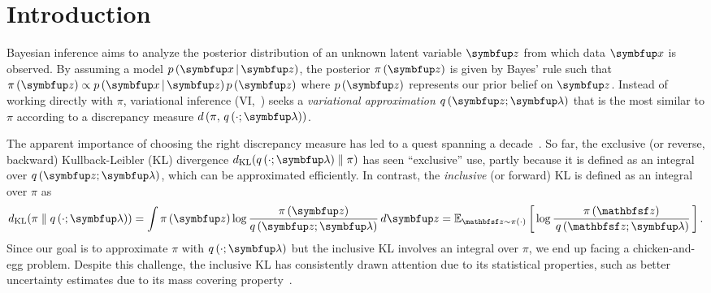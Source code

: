 
\section{Introduction}\label{section:intro}
Bayesian inference aims to analyze the posterior distribution of an unknown latent variable \(\vz\) from which data \(\vx\) is observed.
By assuming a model \(p\,(\vx\,|\,\vz)\), the posterior \(\pi\,(\vz)\) is given by Bayes' rule such that \(\pi\,(\vz) \propto {p\,(\vx\,|\,\vz)\,p\,(\vz)}\) where \(p\,(\vz)\) represents our prior belief on \(\vz\).
Instead of working directly with \(\pi\), variational inference (VI,~\citealt{blei_variational_2017}) seeks a \textit{variational approximation} \(q\,(\vz; \vlambda)\) that is the most similar to \(\pi\) according to a discrepancy measure \(d\,(\pi,\, q\,(\cdot; \vlambda))\).

The apparent importance of choosing the right discrepancy measure has led to a quest spanning a decade~\citep{NIPS2017_35464c84, NEURIPS2018_1cd138d0, NEURIPS2020_c928d86f, regli_alphabeta_2018, pmlr-v48-hernandez-lobatob16,NIPS2016_7750ca35,pmlr-v37-salimans15,pmlr-v97-ruiz19a,NEURIPS2021_05f971b5,NEURIPS2021_a1a609f1}.
So far, the exclusive (or reverse, backward)  Kullback-Leibler (KL) divergence \(\DKL{q\left(\cdot; \vlambda\right)}{\pi}\) has seen ``exclusive'' use, partly because it is defined as an integral over \(q\,(\vz; \vlambda)\), which can be approximated efficiently.
In contrast, the \textit{inclusive} (or forward) KL is defined as an integral over \(\pi\) as
%
{%
\vspace{-0.05in}
\begin{align*}
  \DKL{\pi}{q\left(\cdot; \vlambda\right)}
  = \int \pi\,(\vz) \log \frac{\pi\left(\vz\right)}{q\,(\vz; \vlambda)} \,d\vz
  = \Esub{\rvvz \sim \pi\left(\cdot\right)}{\log \frac{\pi\left(\rvvz\right)}{\,q\,(\rvvz; \vlambda)} }. %
\end{align*}
}%
Since our goal is to approximate \(\pi\) with \(q\left(\cdot;\vlambda\right)\) but the inclusive KL involves an integral over \(\pi\), we end up facing a chicken-and-egg problem.
Despite this challenge, the inclusive KL has consistently drawn attention due to its statistical properties, such as better uncertainty estimates due to its mass covering property~\citep{minka2005divergence, mackay_local_2001}.

